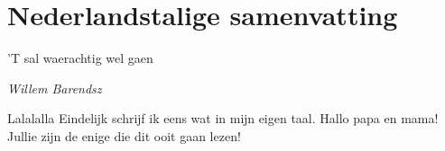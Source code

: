 \cleardoubleevenemptypage
\chapter{Nederlandstalige samenvatting}
\label{ch:layman-summary}

\pgfmathsetmacro\chapclr{\colourarray[8]}
\hypersetup{
citecolor  = \chapclr,
linkcolor  = \chapclr,
urlcolor   = \chapclr,
}

\epigraph{
  'T sal waerachtig wel gaen
}{
  \textit{Willem Barendsz}
}
\begin{otherlanguage}{dutch}
 
  Lalalalla Eindelijk schrijf ik eens wat in mijn eigen taal. Hallo papa en mama! Jullie zijn de enige die dit ooit gaan lezen! 

  \lipsum[1-2]

\end{otherlanguage}
